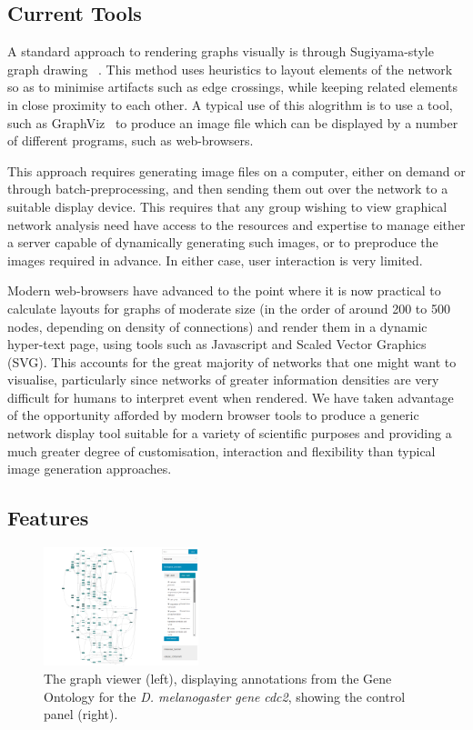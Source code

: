 \documentclass[10pt,a4paper,twocolumn]{article}
\begin{document}
\subsection*{Current Tools}

A standard approach to rendering graphs visually is through Sugiyama-style 
graph drawing ~\cite{sugiyama}. This method uses heuristics to layout elements
of the network so as to minimise artifacts such as edge crossings, while keeping
related elements in close proximity to each other. A typical use of this 
alogrithm is to use a tool, such as GraphViz~\cite{graphviz}
to produce an image file which can be displayed by a number of different programs,
such as web-browsers.

This approach requires generating image files on a computer, either on demand
or through batch-preprocessing, and then sending them out over the network to
a suitable display device. This requires that any group wishing to view graphical
network analysis need have access to the resources and expertise to manage either
a server capable of dynamically generating such images, or to preproduce the
images required in advance. In either case, user interaction is very limited.

Modern web-browsers have advanced to the point where it is now practical to
calculate layouts for graphs of moderate size (in the order of around 200 to 500
nodes, depending on density of connections) and render them in a dynamic hyper-text
page, using tools such as Javascript and Scaled Vector Graphics (SVG). This accounts
for the great majority of networks that one might want to visualise, particularly
since networks of greater information densities are very difficult for humans to
interpret event when rendered. We have taken advantage of the opportunity afforded
by modern browser tools to produce a generic network display tool suitable for a
variety of scientific purposes and providing a much greater degree of customisation,
interaction and flexibility than typical image generation approaches.

\subsection*{Features}

\begin{figure}[htb]
\centering
\includegraphics[width=0.4\textwidth]{dagify.png}
\caption{
    \label{fig:1}
    The graph viewer (left), displaying annotations from the Gene Ontology for
    the \textit{D. melanogaster gene} \emph{cdc2}, showing the control panel (right).
}
\end{figure}
\end{document}

